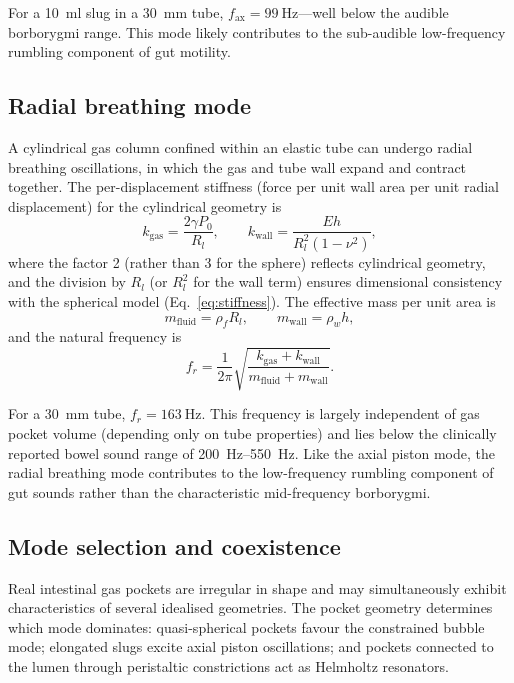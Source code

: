 \documentclass[12pt]{article}
\begin{document}
For a \SI{10}{\milli\litre} slug in a \SI{30}{\milli\metre} tube,
$f_\mathrm{ax} = \SI{99}{\hertz}$---well below the audible borborygmi range.
This mode likely contributes to the sub-audible low-frequency rumbling
component of gut motility.

\subsection{Radial breathing mode}
\label{sec:radial}

A cylindrical gas column confined within an elastic tube can undergo radial
breathing oscillations, in which the gas and tube wall expand and contract
together.  The per-displacement stiffness (force per unit wall area per unit
radial displacement) for the cylindrical geometry is
\begin{equation}
  k_\mathrm{gas} = \frac{2\gamma P_0}{R_l}, \qquad
  k_\mathrm{wall} = \frac{Eh}{R_l^2(1-\nu^2)},
  \label{eq:radial_stiffness}
\end{equation}
where the factor 2 (rather than 3 for the sphere) reflects cylindrical
geometry, and the division by $R_l$ (or $R_l^2$ for the wall term) ensures
dimensional consistency with the spherical model
(Eq.~\eqref{eq:stiffness}).  The effective mass per unit area is
\begin{equation}
  m_\mathrm{fluid} = \rho_f R_l, \qquad
  m_\mathrm{wall} = \rho_w h,
  \label{eq:radial_mass}
\end{equation}
and the natural frequency is
\begin{equation}
  f_r = \frac{1}{2\pi}\sqrt{\frac{k_\mathrm{gas} + k_\mathrm{wall}}
    {m_\mathrm{fluid} + m_\mathrm{wall}}}.
  \label{eq:radial}
\end{equation}

For a \SI{30}{\milli\metre} tube, $f_r = \SI{163}{\hertz}$.  This frequency
is largely independent of gas pocket volume (depending only on tube
properties) and lies below the clinically reported bowel sound range of
\SIrange{200}{550}{\hertz}.  Like the axial piston mode, the radial breathing
mode contributes to the low-frequency rumbling component of gut sounds rather
than the characteristic mid-frequency borborygmi.

\subsection{Mode selection and coexistence}
\label{sec:mode_selection}

Real intestinal gas pockets are irregular in shape and may simultaneously
exhibit characteristics of several idealised geometries.  The pocket geometry
determines which mode dominates: quasi-spherical pockets favour the
constrained bubble mode; elongated slugs excite axial piston oscillations;
and pockets connected to the lumen through peristaltic constrictions act as
Helmholtz resonators.
\end{document}
